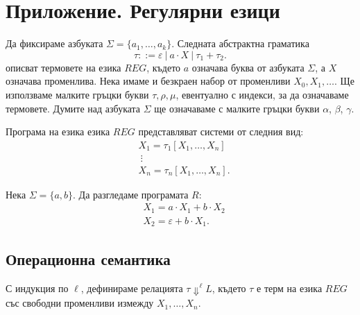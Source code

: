 \section{Приложение. Регулярни езици}

Да фиксираме азбуката $\Sigma = \{a_1,\dots,a_k\}$.
Следната абстрактна граматика 
\[\tau ::= \varepsilon\ |\ a \cdot X\ |\ \tau_1 + \tau_2.\]
описват термовете на езика $REG$, където $a$ означава буква от азбуката $\Sigma$, а $X$ означава променлива. Нека имаме и безкраен набор от променливи $X_0,X_1,\dots$. Ще използваме малките гръцки букви $\tau,\rho,\mu$, евентуално с индекси, за да означаваме термовете. Думите над азбуката $\Sigma$ ще означаваме с малките гръцки букви $\alpha$, $\beta$, $\gamma$.

Програма на езика езика $REG$ представляват системи от следния вид:
\begin{align*}
  & X_1 = \tau_1[X_1,\dots,X_n]\\
  & \ \vdots\\
  & X_n = \tau_n[X_1,\dots,X_n].
\end{align*}

\begin{example}
  Нека $\Sigma = \{a,b\}$. Да разгледаме програмата $R$:
  \begin{align*}
    & X_1 = a \cdot X_1 + b \cdot X_2\\
    & X_2 = \varepsilon + b \cdot X_1.
  \end{align*}
\end{example}


\subsection{Операционна семантика}

С индукция по $\ell$, дефинираме релацията $\tau \Downarrow^\ell L$,
където $\tau$ е терм на езика $REG$ със свободни променливи измежду $X_1,\dots, X_n$.



